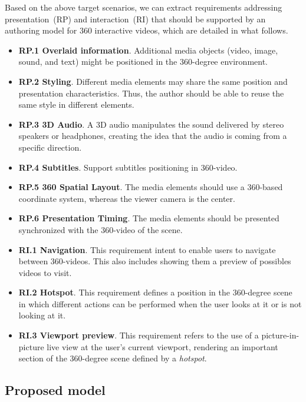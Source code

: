 Based on the above target scenarios, we can extract requirements addressing presentation~(RP) and interaction~(RI) that should be supported by an authoring model for 360 interactive videos, which are detailed in what follows.

\begin{itemize}
    \item \textbf{RP.1 Overlaid information}. Additional media objects (video, image, sound, and text) might be positioned in the 360-degree environment.
   \item \textbf{RP.2 Styling}. Different media elements may share the same position and presentation characteristics. Thus, the author should be able to reuse the same style in different elements.
  \item \textbf{RP.3 3D Audio}. A 3D audio manipulates the sound delivered by stereo speakers or headphones, creating the idea that the audio is coming from a specific direction.
  \item \textbf{RP.4 Subtitles}. Support subtitles positioning in 360-video.
  \item \textbf{RP.5 360 Spatial Layout}. The media elements should use a 360-based coordinate system, whereas the viewer camera is the center.
  \item \textbf{RP.6 Presentation Timing}. The media elements should be presented synchronized with the 360-video of the scene. 
  \item \textbf{RI.1 Navigation}. This requirement intent to enable users to navigate between 360-videos. This also includes showing them a preview of possibles videos to visit.
  \item \textbf{RI.2 Hotspot}. This requirement defines a position in the 360-degree scene in which different actions can be performed when the user looks at it or is not looking at it.
  \item \textbf{RI.3 Viewport preview}. This requirement refers to the use of a picture-in-picture live view at the user's current viewport, rendering an important section of the 360-degree scene defined by a \emph{hotspot}.
\end{itemize}



\subsection{Proposed model}
\label{subsec:proposal}
 
